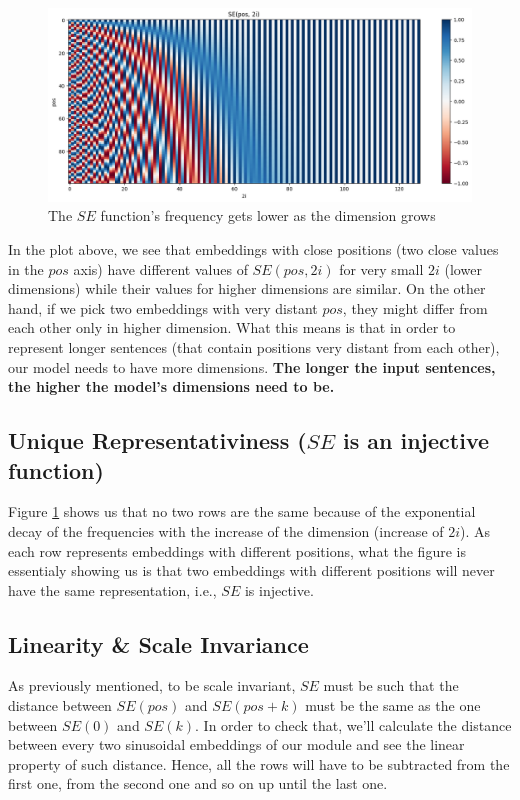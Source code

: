 \documentclass{article}
\begin{document}
\begin{figure}[h] 
	\centering
	\includegraphics[width=\linewidth]{images/sin_embeds_freq_decay.png}
	\caption{The $SE$ function's frequency gets lower as the dimension grows}
	\label{fig:sin_embeds_freq_decay}
\end{figure}

In the plot above, we see that embeddings with close positions (two close values in the $pos$ axis) have different values of $SE(pos, 2i)$ for very small $2i$ (lower dimensions) while their values for higher dimensions are similar. On the other hand, if we pick two embeddings with very distant $pos$, they might differ from each other only in higher dimension. What this means is that in order to represent longer sentences (that contain positions very distant from each other), our model needs to have more dimensions. \textbf{The longer the input sentences, the higher the model's dimensions need to be.}

\subsection{Unique Representativiness ($SE$ is an injective function)}

Figure \ref{fig:sin_embeds_freq_decay} shows us that no two rows are the same because of the exponential decay of the frequencies with the increase of the dimension (increase of $2i$). As each row represents embeddings with different positions, what the figure is essentialy showing us is that two embeddings with different positions will never have the same representation, i.e., $SE$ is injective.

\subsection{Linearity \& Scale Invariance}

As previously mentioned, to be scale invariant, $SE$ must be such that the distance between $SE(pos)$ and $SE(pos + k)$ must be the same as the one between $SE(0)$ and $SE(k)$. In order to check that, we'll calculate the distance between every two sinusoidal embeddings of our module and see the linear property of such distance. Hence, all the rows will have to be subtracted from the first one, from the second one and so on up until the last one. 
\end{document}
